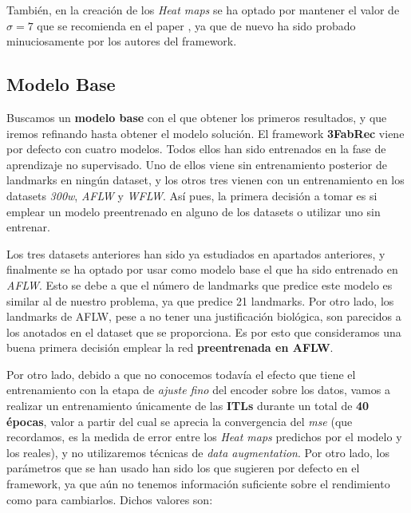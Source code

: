         \medskip

        \noindent También, en la creación de los \textit{Heat maps} se ha optado por mantener el valor de $\sigma =7$ que se recomienda en el paper \cite{browatzki20203fabrec}, ya que de nuevo ha sido probado minuciosamente por los autores del framework.
    
    \subsection{Modelo Base}
        \noindent Buscamos un \textbf{modelo base} con el que obtener los primeros resultados, y que iremos refinando hasta obtener el modelo solución. El framework \textbf{3FabRec} viene por defecto con cuatro modelos. Todos ellos han sido entrenados en la fase de aprendizaje no supervisado. Uno de ellos viene sin entrenamiento posterior de landmarks en ningún dataset, y los otros tres vienen con un entrenamiento en los datasets \textit{300w}, \textit{AFLW} y \textit{WFLW}. Así pues, la primera decisión a tomar es si emplear un modelo preentrenado en alguno de los datasets o utilizar uno sin entrenar. 

        \medskip

        \noindent Los tres datasets anteriores han sido ya estudiados en apartados anteriores, y finalmente se ha optado por usar como modelo base el que ha sido entrenado en \textit{AFLW}. Esto se debe a que el número de landmarks que predice este modelo es similar al de nuestro problema, ya que predice 21 landmarks. Por otro lado, los landmarks de AFLW, pese a no tener una justificación biológica, son parecidos a los anotados en el dataset que se proporciona. Es por esto que consideramos una buena primera decisión emplear la red \textbf{preentrenada en AFLW}.

        \medskip

        \noindent Por otro lado, debido a que no conocemos todavía el efecto que tiene el entrenamiento con la etapa de \textit{ajuste fino} del encoder sobre los datos, vamos a realizar un entrenamiento únicamente de las \textbf{ITLs} durante un total de \textbf{40 épocas}, valor a partir del cual se aprecia la convergencia del \textit{mse} (que recordamos, es la medida de error entre los \textit{Heat maps} predichos por el modelo y los reales), y no utilizaremos técnicas de \textit{data augmentation}. Por otro lado, los parámetros que se han usado han sido los que sugieren por defecto en el framework, ya que aún no tenemos información suficiente sobre el rendimiento como para cambiarlos. Dichos valores son: 

